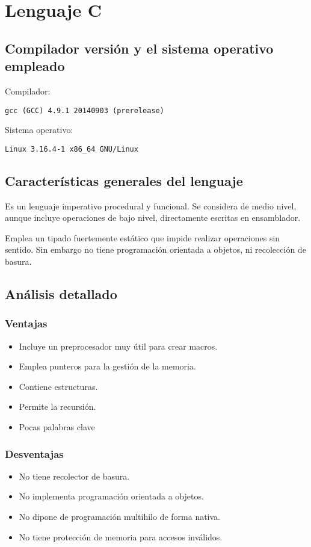 \documentclass[12pt,a4paper]{article}
\begin{document}


\section{Lenguaje C}

\subsection{Compilador versión y el sistema operativo empleado}
Compilador:
\begin{lstlisting}
gcc (GCC) 4.9.1 20140903 (prerelease)
\end{lstlisting}
Sistema operativo:
\begin{lstlisting}
Linux 3.16.4-1 x86_64 GNU/Linux
\end{lstlisting}


\subsection{Características generales del lenguaje}
Es un lenguaje imperativo procedural y funcional. Se considera de medio nivel,
aunque incluye operaciones de bajo nivel, directamente escritas en ensamblador.

Emplea un tipado fuertemente estático que impide realizar operaciones sin
sentido. Sin embargo no tiene programación orientada a objetos, ni recolección
de basura.


\subsection{Análisis detallado}

\subsubsection{Ventajas}
\begin{itemize}
\item Incluye un preprocesador muy útil para crear macros.
\item Emplea punteros para la gestión de la memoria.
\item Contiene estructuras.
\item Permite la recursión.
\item Pocas palabras clave
\end{itemize}

\subsubsection{Desventajas}
\begin{itemize}
\item No tiene recolector de basura.
\item No implementa programación orientada a objetos.
\item No dipone de programación multihilo de forma nativa.
\item No tiene protección de memoria para accesos inválidos.
\end{itemize}
\end{document}
